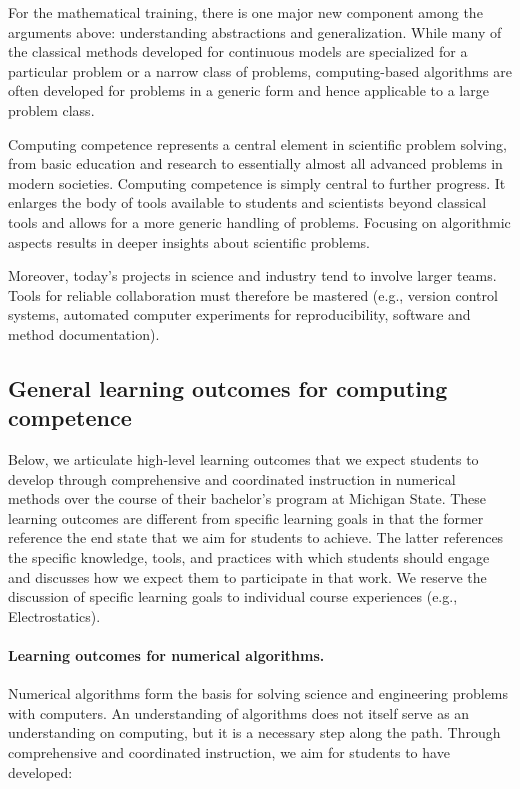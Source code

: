 \documentclass[%
oneside,                 %
final,                   %
10pt]{article}
\begin{document}
For the mathematical training, there is one major new component among the arguments above: understanding abstractions and generalization. While many of the classical methods developed for continuous models are specialized for a particular problem or a narrow class of problems, computing-based algorithms are often developed for problems in a generic form and hence applicable to a large problem class.


Computing competence represents a central element in scientific problem solving, from basic education and research to essentially almost all advanced problems in modern societies. Computing competence is simply central to further progress. It enlarges the body of tools available to students and scientists beyond classical tools and allows for a more generic handling of problems. Focusing on algorithmic aspects results in deeper insights about scientific problems.

Moreover, today's projects in science and industry tend to involve larger teams. Tools for reliable collaboration must therefore be mastered (e.g., version control systems, automated computer experiments for reproducibility, software and method documentation).


\subsection{General learning outcomes for computing competence}

Below, we articulate high-level learning outcomes that we expect students to develop through comprehensive and coordinated instruction in numerical methods over the course of their bachelor's program at Michigan State. These learning outcomes are different from specific learning goals in that the former reference the end state that we aim for students to achieve. The latter references the specific knowledge, tools, and practices with which students should engage and discusses how we expect them to participate in that work. We reserve the discussion of specific learning goals to individual course experiences (e.g., Electrostatics).

\paragraph{Learning outcomes for numerical algorithms.}
Numerical algorithms form the basis for solving science and engineering problems with computers. An understanding of algorithms does not itself serve as an understanding on computing, but it is a necessary step along the path. Through comprehensive and coordinated instruction, we aim for students to have developed:
\end{document}
